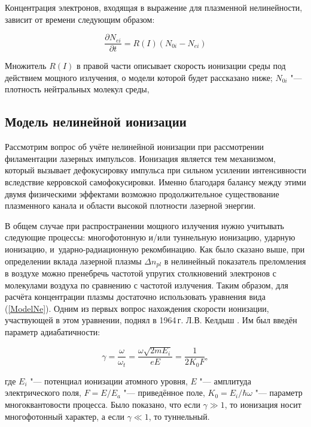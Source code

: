 Концентрация электронов, входящая в выражение для плазменной нелинейности,
зависит от времени следующим образом:

\begin{equation}\label{ModelNe}
\dfrac{\partial N_{ei}}{\partial t} = R(I)(N_{0i} - N_{ei})
\end{equation}

Множитель $R(I)$ в правой части описывает скорость ионизации среды под действием мощного излучения,
о модели которой будет рассказано ниже; $N_{0i}$ "--- плотность нейтральных молекул среды,


\subsection{Модель нелинейной ионизации}

Рассмотрим вопрос об учёте нелинейной ионизации при рассмотрении филаментации лазерных импульсов.
Ионизация является тем механизмом, который вызывает дефокусировку импульса при сильном усилении интенсивности
вследствие керровской самофокусировки. Именно благодаря балансу между этими двумя физическими эффектами
возможно продолжительное существование плазменного канала и области высокой плотности лазерной энергии.


В общем случае при распространении мощного излучения нужно учитывать следующие процессы: многофотонную и/или туннельную ионизацию,
ударную ионизацию, и~ударно-радиационную рекомбинацию. Как было сказано выше, при определении вклада лазерной плазмы
$\Delta n_{pl}$ в нелинейный показатель преломления в воздухе можно пренебречь частотой упругих столкновений электронов
с молекулами воздуха по сравнению с частотой излучения. Таким образом, для расчёта концентрации плазмы достаточно
использовать уравнения вида (\ref{ModelNe}). Одним из первых вопрос нахождения скорости ионизации, участвующей в этом уравнении,
поднял в 1964\,г. Л.В. Келдыш \cite{Keldysh1964}. Им был введён параметр адиабатичности:

\begin{equation}
\gamma = \frac{\omega}{\omega_t} = \frac{\omega \sqrt{2 m E_i}}{e E} = \frac{1}{2 K_0 F},
\end{equation}

\noindent где $E_i$ "--- потенциал ионизации атомного уровня, $E$ "--- амплитуда электрического поля,
$F = E/E_a$ "--- приведённое поле, $K_0 = E_i/\hbar\omega$ "--- параметр многоквантовости процесса.
Было показано, что если $\gamma \gg 1$, то ионизация носит многофотонный характер, а если $\gamma \ll 1$, то туннельный.


